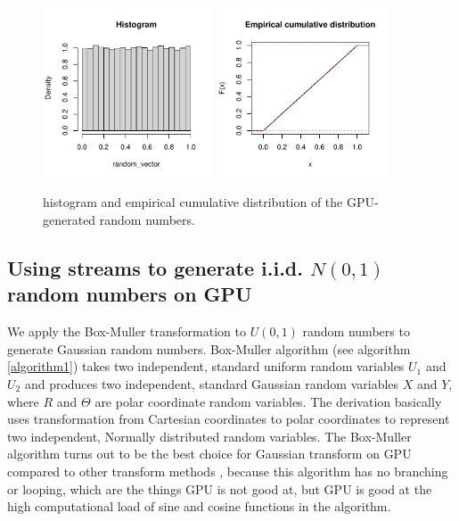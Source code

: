 \documentclass[article,nojss]{jss}\usepackage[]{graphicx}\usepackage[]{color}
\newenvironment{knitrout}{}{} %
\begin{document}
\begin{figure}[H]
\centering
\begin{knitrout}
\color{fgcolor}
\includegraphics[width=0.45\textwidth]{figure/largenumberuniforms-1} 
\includegraphics[width=0.45\textwidth]{figure/largenumberuniforms-2} 
\end{knitrout}
\caption{\label{fig0} histogram and empirical cumulative distribution of the GPU-generated random numbers.}
\end{figure}


\subsection{Using streams to generate i.i.d. $N (0, 1)$ random numbers on GPU}
We apply the Box-Muller transformation to $U (0,1)$ random numbers to generate Gaussian random numbers. Box-Muller algorithm (see algorithm \ref{algorithm1}) takes two independent, standard uniform random variables $U_1$ and $U_2$ and produces two independent, standard Gaussian random variables $X$ and $Y$, where $R$ and $\Theta$ are polar coordinate random variables. The derivation basically uses transformation from Cartesian coordinates to polar coordinates to represent two independent, Normally distributed random variables. The Box-Muller algorithm turns out to be the best choice for Gaussian transform on GPU compared to other transform methods \citep{howes2007efficient}, because this algorithm has no branching or looping, which are the things GPU is not good at, but GPU is good at the high computational load of sine and cosine functions in the algorithm. 
\end{document}
